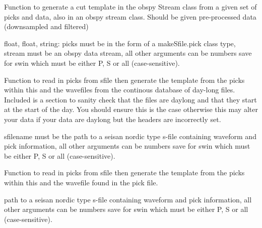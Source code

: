 \documentclass[a4paper,10pt,english]{sphinxmanual}
\begin{document}
\begin{fulllineitems}
\label{modules:template_gen._template_gen}
Function to generate a cut template in the obspy
Stream class from a given set of picks and data, also in an obspy stream
class.  Should be given pre-processed data (downsampled and filtered)
\begin{quote}\begin{description}
\end{description}\end{quote}

float, float, string: picks must be in the form of a makeSfile.pick class
type, stream must be an obspy data stream, all other arguments can be
numbers save for swin which must be either P, S or all (case-sensitive).

\end{fulllineitems}


\begin{fulllineitems}
\label{modules:template_gen.from_contbase}
Function to read in picks from sfile then generate the template from the
picks within this and the wavefiles from the continous database of day-long
files.  Included is a section to sanity check that the files are daylong and
that they start at the start of the day.  You should ensure this is the case
otherwise this may alter your data if your data are daylong but the headers
are incorrectly set.
\begin{quote}\begin{description}
\end{description}\end{quote}

sfilename must be the
path to a seisan nordic type s-file containing waveform and pick
information, all other arguments can be numbers save for swin which must
be either P, S or all (case-sensitive).

\end{fulllineitems}


\begin{fulllineitems}
\label{modules:template_gen.from_sfile}
Function to read in picks from sfile then generate the template from the
picks within this and the wavefile found in the pick file.
\begin{quote}\begin{description}
\end{description}\end{quote}

path to a seisan nordic type s-file containing waveform and pick
information, all other arguments can be numbers save for swin which must
be either P, S or all (case-sensitive).

\end{fulllineitems}
\end{document}
